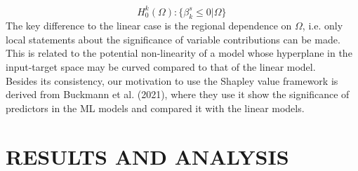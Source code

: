 \documentclass[12pt,italian, twoside]{report}
\begin{document}
	\begin{equation}
	H^k_0 (\Omega)  \colon \{\beta^s_k \leq 0 | \Omega\} \, 
	\label{eq:hyp}
\end{equation}
The key difference to the linear case is the regional dependence on \(\Omega\), i.e. only local statements about the significance of variable contributions can be made. This is related to the potential non-linearity of a model whose hyperplane in the input-target space may be curved compared to that of the linear model.
\\
Besides its consistency, our motivation to use the Shapley value framework is derived from Buckmann et al. (2021), where they use it show the significance of predictors in the ML models and compared it with the linear models.

% 

\chapter{RESULTS AND ANALYSIS}
\label{cap5}
\end{document}
